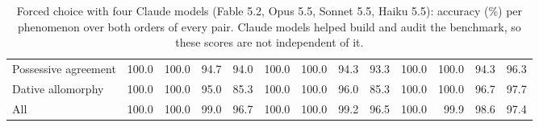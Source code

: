 \begin{table}[t]
\begin{tabular}{@{}lrrrrrrrrrrrr@{}}
Possessive agreement & 100.0 & 100.0 & 94.7 & 94.0 & 100.0 & 100.0 & 94.3 & 93.3 & 100.0 & 100.0 & 94.3 & 96.3 \\
Dative allomorphy & 100.0 & 100.0 & 95.0 & 85.3 & 100.0 & 100.0 & 96.0 & 85.3 & 100.0 & 100.0 & 96.7 & 97.7 \\
\midrule
All & 100.0 & 100.0 & 99.0 & 96.7 & 100.0 & 100.0 & 99.2 & 96.5 & 100.0 & 99.9 & 98.6 & 97.4 \\
\bottomrule
\end{tabular}
\caption{Forced choice with four Claude models (Fable 5.2, Opus 5.5, Sonnet 5.5, Haiku 5.5): accuracy (\%) per phenomenon over both orders of every pair. Claude models helped build and audit the benchmark, so these scores are not independent of it.}
\label{tab:claudephen}
\end{table}
